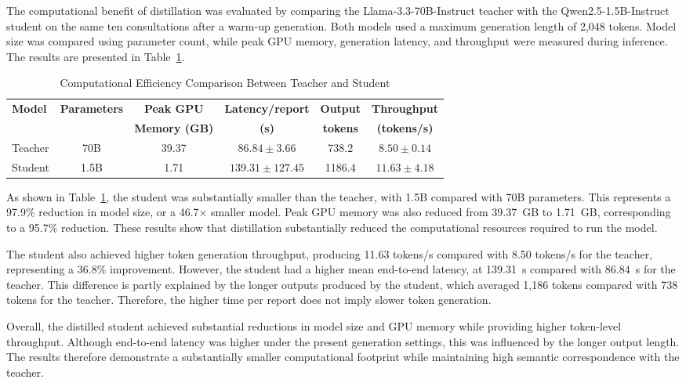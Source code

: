 \documentclass[ %
                    author={Aman Kumar Singh},
                supervisor={Dr. Edwin Simpson},
                    degree={MSc},
                     title={Quality-Aware Knowledge Distillation of Large Language Models for Efficient Personalised Clinical Report Generation},
                  subtitle={},
                      type={},
                      year={2021}]{dissertation}
\begin{document}
The computational benefit of distillation was evaluated by comparing the
Llama-3.3-70B-Instruct teacher with the Qwen2.5-1.5B-Instruct student on
the same ten consultations after a warm-up generation. Both models used a
maximum generation length of 2,048 tokens. Model size was compared using
parameter count, while peak GPU memory, generation latency, and throughput
were measured during inference. The results are presented in
Table~\ref{tab:computational_efficiency}.
\vspace{-15pt}
\begin{table}[H]
\centering
\footnotesize
\caption{Computational Efficiency Comparison Between Teacher and Student}
\label{tab:computational_efficiency}
\begin{tabular}{lccccc}
\hline
\textbf{Model} & \textbf{Parameters} & \textbf{Peak GPU} &
\textbf{Latency/report} & \textbf{Output} & \textbf{Throughput} \\
& & \textbf{Memory (GB)} & \textbf{(s)} & \textbf{tokens} &
\textbf{(tokens/s)} \\
\hline
Teacher
& 70B & 39.37 & $86.84 \pm 3.66$ & 738.2 & $8.50 \pm 0.14$ \\
Student
& 1.5B & 1.71 & $139.31 \pm 127.45$ & 1186.4 & $11.63 \pm 4.18$ \\
\hline
\end{tabular}
\end{table}

As shown in Table~\ref{tab:computational_efficiency}, the student was
substantially smaller than the teacher, with 1.5B compared with 70B
parameters. This represents a 97.9\% reduction in model size, or a
46.7$\times$ smaller model. Peak GPU memory was also reduced from
39.37~GB to 1.71~GB, corresponding to a 95.7\% reduction. These results
show that distillation substantially reduced the computational resources
required to run the model.

The student also achieved higher token generation throughput, producing
11.63 tokens/s compared with 8.50 tokens/s for the teacher, representing
a 36.8\% improvement. However, the student had a higher mean end-to-end
latency, at 139.31~s compared with 86.84~s for the teacher. This difference
is partly explained by the longer outputs produced by the student, which
averaged 1,186 tokens compared with 738 tokens for the teacher. Therefore,
the higher time per report does not imply slower token generation.

Overall, the distilled student achieved substantial reductions in model
size and GPU memory while providing higher token-level throughput. Although
end-to-end latency was higher under the present generation settings, this
was influenced by the longer output length. The results therefore
demonstrate a substantially smaller computational footprint while
maintaining high semantic correspondence with the teacher.
\end{document}
